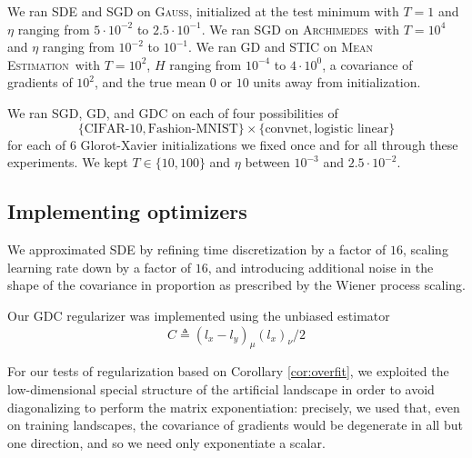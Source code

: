 \documentclass[openany, notitlepage, justified]{tufte-book}
\theoremstyle{plain}
\theoremstyle{definition}
\newcommand{\Gauss}{\textsc{Gauss}}
\newcommand{\Archimedes}{\textsc{Archimedes}}
\newcommand{\MeanEstimation}{\textsc{Mean Estimation}}
\begin{document}
            We ran SDE and SGD on \Gauss,
            initialized at the test minimum with $T=1$ and $\eta$ ranging from
            $5\cdot 10^{-2}$ to $2.5\cdot 10^{-1}$.
            We ran SGD on \Archimedes\
            with $T=10^4$
            and $\eta$ ranging from $10^{-2}$ to $10^{-1}$.
            We ran GD and STIC on \MeanEstimation\
            with $T=10^2$, $H$ ranging from $10^{-4}$ to $4 \cdot 10^0$,
            a covariance of gradients of $10^2$, and the true mean $0$ or
            $10$ units away from initialization.

            We ran SGD, GD, and GDC on each of four possibilities of
            $$
                \{\text{CIFAR-10},\text{Fashion-MNIST}\}\times\{\text{convnet}, \text{logistic linear}\}
            $$
            for each of $6$
            Glorot-Xavier initializations we fixed once and for all through
            these experiments.  We kept $T\in \{10,100\}$
            and $\eta$ between $10^{-3}$ and $2.5 \cdot 10^{-2}$.  

        \subsection{Implementing optimizers}                            \label{appendix:optimizers}

            We approximated SDE by refining time discretization by a factor of
            $16$, scaling learning rate down by a factor of $16$, and introducing
            additional noise in the shape of the covariance in proportion as
            prescribed by the Wiener process scaling.

            Our GDC regularizer was implemented using the unbiased estimator
            $$
                \hat{C} \triangleq (l_x - l_y)_\mu (l_x)_\nu / 2
            $$
            
            For our tests of regularization based on Corollary \ref{cor:overfit},
            we exploited the low-dimensional special structure of the artificial
            landscape in order to avoid diagonalizing to perform the matrix
            exponentiation: precisely, we used that, even on training landscapes,
            the covariance of gradients would be degenerate in all but one
            direction, and so we need only exponentiate a scalar.

\end{document}
